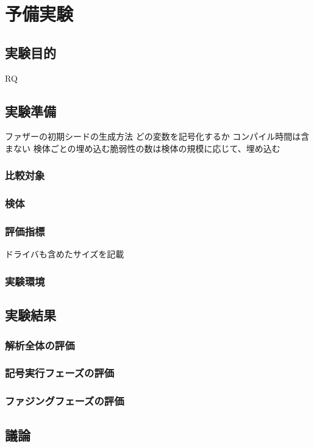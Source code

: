 \section{予備実験}
\subsection{実験目的}
RQ
\subsection{実験準備}
ファザーの初期シードの生成方法
どの変数を記号化するか
コンパイル時間は含まない
検体ごとの埋め込む脆弱性の数は検体の規模に応じて、埋め込む
\subsubsection{比較対象}
\subsubsection{検体}
\subsubsection{評価指標}
ドライバも含めたサイズを記載
\subsubsection{実験環境}
\subsection{実験結果}
\subsubsection{解析全体の評価}
\subsubsection{記号実行フェーズの評価}
\subsubsection{ファジングフェーズの評価}
\subsection{議論}
